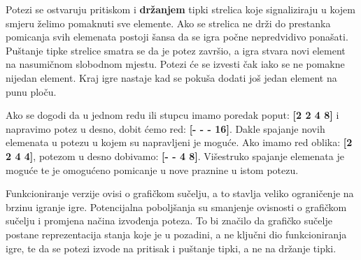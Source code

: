 \par
Potezi se ostvaruju pritiskom i \textbf{držanjem} tipki strelica koje signaliziraju u kojem smjeru želimo pomaknuti sve elemente. Ako se strelica ne drži do prestanka pomicanja svih elemenata postoji šansa da se igra počne nepredvidivo ponašati. Puštanje tipke strelice smatra se da je potez završio, a igra stvara novi element na nasumičnom slobodnom mjestu. Potezi će se izvesti čak iako se ne pomakne nijedan element. Kraj igre nastaje kad se pokuša dodati još jedan element na punu ploču.\par 
Ako se dogodi da u jednom redu ili stupcu imamo poredak poput:
\textbf{[2 2 4 8]} i napravimo potez u desno, dobit ćemo red: \textbf{[- - - 16]}. Dakle spajanje novih elemenata u potezu u kojem su napravljeni je moguće. Ako imamo red oblika: \textbf{[2 2 4 4]}, potezom u desno dobivamo: \textbf{[- - 4 8]}. Višestruko spajanje elemenata je moguće te je omogućeno pomicanje u nove praznine u istom potezu.\par 
Funkcioniranje verzije ovisi o grafičkom sučelju, a to stavlja veliko ograničenje na brzinu igranje igre. Potencijalna poboljšanja su smanjenje ovisnosti o grafičkom sučelju i promjena načina izvođenja poteza. To bi značilo da grafičko sučelje postane reprezentacija stanja koje je u pozadini, a ne ključni dio funkcioniranja igre, te da se potezi izvode na pritisak i puštanje tipki, a ne na držanje tipki.



